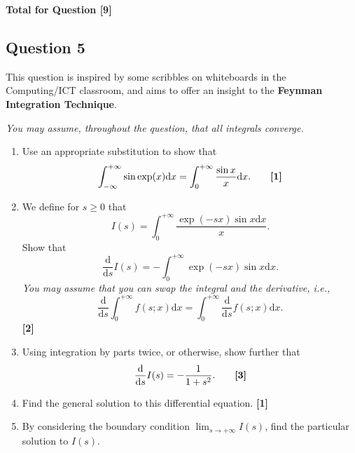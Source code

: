 \documentclass[12pt]{article}
\begin{document}
            \hfill\textbf{Total for Question [9]}
    
        
        \subsection{Question 5}
            This question is inspired by some scribbles on whiteboards in the Computing/ICT classroom, and aims to offer an insight to the \textbf{Feynman Integration Technique}.

            \textit{You may assume, throughout the question, that all integrals converge.}
    
            \begin{enumerate}
                \item Use an appropriate substitution to show that
                    \[
                    \int_{-\infty}^{+\infty} \sin \exp(x) \mathrm{d}x = \int_{0}^{+\infty} \frac{\sin x}{x} \mathrm{d}x. \tag*{\textbf{[1]}}
                    \]
                    
                \item  We define for \(s \geq 0\) that
                    \[
                    I(s)=\int_0^{+\infty}\frac{\exp(-sx) \sin x \mathrm{d}x}{x}.
                    \]
                    Show that
                    \[
                    \frac{\mathrm{d}}{\mathrm{d}s} I(s) = - \int_0^{+\infty} \exp(-sx) \sin x \mathrm{d}x.
                    \]
                    \textit{You may assume that you can swap the integral and the derivative, i.e.,}
                    \[
                    \frac{\mathrm{d}}{\mathrm{d}s} \int_0^{+\infty} f(s; x) \mathrm{d}x = \int_0^{+\infty} \frac{\mathrm{d}}{\mathrm{d}s} f(s; x) \mathrm{d}x.
                    \]
                    \hfill\textbf{[2]}
            
                \item Using integration by parts twice, or otherwise, show further that
                    \[
                    \frac{\mathrm{d}}{\mathrm{d}s} I(s) = - \frac{1}{1+s^2}. \tag*{\textbf{[3]}}
                    \]
                    
                \item Find the general solution to this differential equation.
                    \hfill\textbf{[1]}
            
                \item  By considering the boundary condition \(\lim_{s \to +\infty} I(s)\), find the particular solution to \(I(s)\).
                

\end{enumerate}
\end{document}
